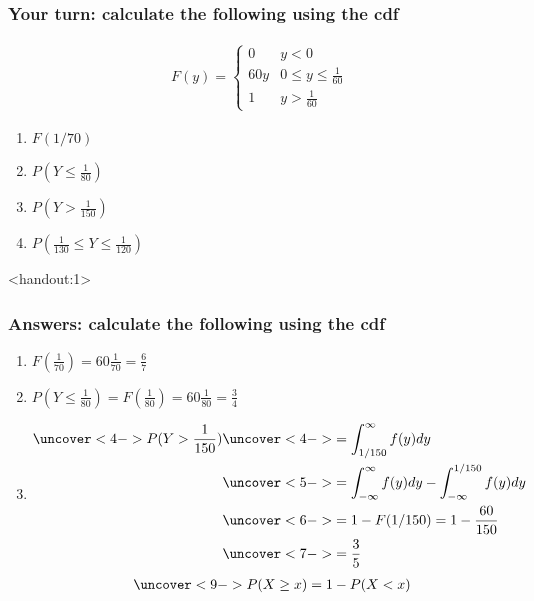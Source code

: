 \documentclass[handout]{beamer}\usepackage[]{graphicx}\usepackage[]{color}
\newcommand{\answers}{1}
\numberwithin{equation}{section}
\begin{document}
\begin{frame}
\frametitle{Your turn: calculate the following using the cdf}

\begin{align*}
F(y) = \begin{cases}
0 & y < 0 \\
60y & 0 \le y \le \frac{1}{60} \\
1 & y > \frac{1}{60}
\end{cases}
\end{align*}

\begin{enumerate}[1. ]
\item $F({1/70})$
\item $P(Y \le \frac{1}{80})$
\item $P(Y > \frac{1}{150})$
\item $P(\frac{1}{130} \le Y  \le \frac{1}{120})$
\end{enumerate}
\end{frame}






\begin{frame}<handout:\answers>
\frametitle{Answers: calculate the following using the cdf}
\begin{enumerate}[1. ]
\pause \item $F(\frac{1}{70}) = 60 \frac{1}{70} = \frac{6}{7}$
\pause \item $P(Y \le \frac{1}{80}) = F(\frac{1}{80}) = 60 \frac{1}{80} = \frac{3}{4}$
\item \begin{align*}
\uncover<4->{P(Y > \frac{1}{150})} & \uncover<4->{= \int_{1/150}^\infty f(y) dy} \\
& \uncover<5->{= \int_{-\infty}^\infty f(y) dy - \int_{-\infty}^{1/150} f(y)dy} \\
& \uncover<6->{= 1 - F(1/150) = 1 - \frac{60}{150}} \\
& \uncover<7->{= \frac{3}{5}}
\end{align*}
\begin{align*}
\uncover<9->{P(X \ge x) = 1 - P(X < x)}
\end{align*}
\end{enumerate}
\end{frame}
\end{document}
